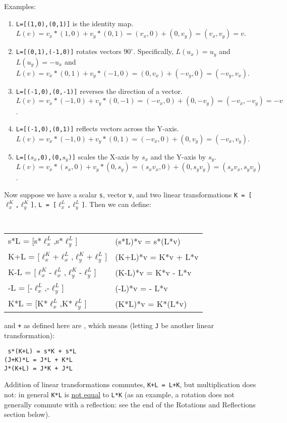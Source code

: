 \documentclass[12pt]{article}
\begin{document}
Examples:
\begin{enumerate}
\item {\tt L=[(1,0),(0,1)]} is the identity map.
$L(v)=v_x*(1,0) + v_y*(0,1) = (v_x,0)+(0,v_y) = (v_x,v_y) = v$.
\item {\tt L=[(0,1),(-1,0)]} rotates vectors $90^\circ$.
Specifically, $L(u_x)=u_y$ and $L(u_y)=-u_x$ and
$L(v)=v_x*(0,1) + v_y*(-1,0) = (0,v_x)+(-v_y,0) = (-v_y,v_x)$.
\item {\tt L=[(-1,0),(0,-1)]} reverses the direction of a vector.
$L(v)=v_x*(-1,0) + v_y*(0,-1) = (-v_x,0)+(0,-v_y) = (-v_x,-v_y) = -v$.
\item {\tt L=[(-1,0),(0,1)]} reflects vectors across the Y-axis.
$L(v)=v_x*(-1,0) + v_y*(0,1) = (-v_x,0)+(0,v_y) = (-v_x,v_y)$.
\item {\tt L=[($s_x$,0),(0,$s_y$)]} scales the X-axis by $s_x$ and
the Y-axis by $s_y$. \\
$L(v)=v_x*(s_x,0) + v_y*(0,s_y)
     = (s_x v_x,0)+(0,s_y v_y)= (s_x v_x, s_y v_y)$.
\end{enumerate}

Now suppose we have a scalar {\tt s}, vector {\tt v},
and two linear transformations
{\tt K = [$\ell^K_x$,$\ell^K_y$]},
{\tt L = [$\ell^L_x$,$\ell^L_y$]}.  Then we can define:
\begin{center}
\tt
\begin{tabular}{l@{~so that~}l}
s*L = [s*$\ell^L_x$,s*$\ell^L_y$]
	 & (s*L)*v = s*(L*v) \\[0.3ex]
K+L = [$\ell^K_x$+$\ell^L_x$,$\ell^K_y$+$\ell^L_y$]
	 & (K+L)*v = K*v + L*v \\[0.3ex]
K-L = [$\ell^K_x$-$\ell^L_x$,$\ell^K_y$-$\ell^L_y$]
	 & (K-L)*v = K*v - L*v \\[0.3ex]
-L = [-$\ell^L_x$,-$\ell^L_y$]
	 & (-L)*v = - L*v \\[0.3ex]
K*L = [K*$\ell^L_x$,K*$\ell^L_y$]
	 & (K*L)*v = K*(L*v)
\end{tabular}
\end{center}

{\tt *} and {\tt +} as defined here are , which means
(letting {\tt J} be another linear transformation):
\begin{center}
\tt
s*(K+L) = s*K + s*L \\
(J+K)*L = J*L + K*L \\
J*(K+L) = J*K + J*L
\end{center}

Addition of linear transformations commutes,
{\tt K+L = L+K}, but multiplication does not:
in general {\tt K*L} is \underline{not equal} to {\tt L*K}
(as an example, a rotation does not generally commute with
a reflection: see the end of the Rotations and Reflections
section below).
\end{document}
